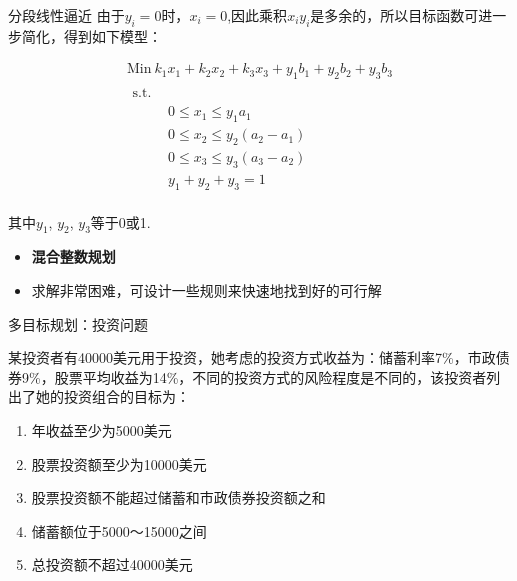 \documentclass[UTF8]{ctexbeamer}
\begin{document}
\begin{frame}{分段线性逼近}
  由于$y_i = 0$时，$x_i = 0$,因此乘积$x_iy_i$是多余的，所以目标函数可进一步简化，得到如下模型：
  
    \[ 
    \begin{array}{c}
      \mbox{Min}\ k_1x_1 + k_2x_2 + k_3x_3 + y_1b_1 + y_2b_2 + y_3b_3\\
      \begin{array}{ll}
        \mbox{s.t.} & \\
        &
        \begin{array}{l}
          0 \le x_1 \le y_1a_1 \\
          0 \le x_2 \le y_2(a_2 - a_1) \\
          0 \le x_3 \le y_3(a_3 - a_2) \\
          y_1 + y_2 + y_3 = 1
        \end{array}
      \end{array}
    \end{array}
    \]
  
    其中$y_1$, $y_2$, $y_3$等于0或1.

    \begin{itemize}
    \item \textbf{混合整数规划}
    \item 求解非常困难，可设计一些规则来快速地找到好的可行解
    \end{itemize}

\end{frame}

\begin{frame}{多目标规划：投资问题}
  \begin{block}{}
    某投资者有40000美元用于投资，她考虑的投资方式收益为：储蓄利率7\%，市政债券9\%，股票平均收益为14\%，不同的投资方式的风险程度是不同的，该投资者列出了她的投资组合的目标为：
    \begin{enumerate}
    \item 年收益至少为5000美元
    \item 股票投资额至少为10000美元
    \item 股票投资额不能超过储蓄和市政债券投资额之和
    \item 储蓄额位于5000～15000之间
    \item 总投资额不超过40000美元
    \end{enumerate}
  \end{block}
\end{frame}
\end{document}
